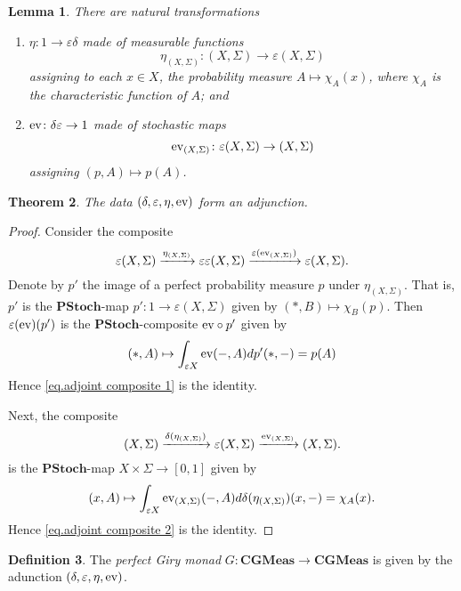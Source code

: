 \documentclass[11pt]{amsart}
\renewcommand{\epsilon}{\varepsilon}
\newcommand{\cat}[1]{\mathbf{#1}}
\newcommand{\ev}{\textup{ev}}
\newcommand{\from}{\colon}
\newcommand{\xto}[1]{\xrightarrow{#1}}
\newtheorem{thm}{Theorem}[section]
\newtheorem{lem}[thm]{Lemma}
\theoremstyle{remark}
\theoremstyle{definition}
\newtheorem{defn}[thm]{Definition}
\begin{document}
\begin{lem}
	There are natural transformations 
	\begin{enumerate}
		\item $\eta \from 1 \to \epsilon \delta$ made of measurable functions
		\[
		\eta_{(X,\Sigma)} \from (X,\Sigma) \to \epsilon (X,\Sigma)
		\]
		assigning to each $x \in X$, the probability measure $A \mapsto \chi_A (x)$, where $\chi_A$ is the characteristic function of $A$; and
		\item $\ev \from \delta \epsilon \to 1$ made of stochastic maps 
		\[
			\ev_{(X,\Sigma)} \from \epsilon (X,\Sigma) \to (X,\Sigma)
		\]
		assigning $(p,A) \mapsto p(A)$.
	\end{enumerate}
\end{lem}

\begin{thm}
	The data $(\delta, \epsilon, \eta, \ev)$ form an adjunction.
\end{thm}
\begin{proof}
	Consider the composite 
	\begin{equation} \label{eq.adjoint composite 1}
		\epsilon (X,\Sigma) \xto{\eta_{(X,\Sigma)}}
		\epsilon \epsilon (X,\Sigma) \xto{\epsilon (\ev_{(X,\Sigma)})}
		\epsilon (X,\Sigma).
	\end{equation}
	Denote by $p'$ the image of a perfect probability measure $p$ under $\eta_{(X,\Sigma)}$. That is, $p'$ is the $\cat{PStoch}$-map $p' \from 1 \to \epsilon (X,\Sigma)$ given by $(\ast,B) \mapsto \chi_B (p)$. Then $\epsilon (\ev) (p')$ is the $\cat{PStoch}$-composite $\ev \circ p'$ given by
	\[
		(\ast,A) \mapsto \int_{\epsilon X} \ev (-,A)dp'(\ast,-) = p(A)
	\]
	 Hence \eqref{eq.adjoint composite 1} is the identity.
	
	Next, the composite 
	\begin{equation} \label{eq.adjoint composite 2}
	(X,\Sigma) \xto{\delta (\eta_{(X,\Sigma)})}
	\epsilon (X,\Sigma) \xto{\ev_{(X,\Sigma)}}
	(X,\Sigma).
	\end{equation}
	is the $\cat{PStoch}$-map $X \times \Sigma \to [0,1]$ given by
	\[
		(x,A) \mapsto \int_{\epsilon X} \ev_{(X,\Sigma)}(-,A)d\delta (\eta_{(X,\Sigma)})(x,-) = \chi_A (x).
	\]
	 Hence \eqref{eq.adjoint composite 2} is the identity.
\end{proof}

\begin{defn}
	The \emph{perfect Giry monad} $G \from \cat{CGMeas} \to\cat{CGMeas}$ is given by the adunction $(\delta, \epsilon, \eta, \ev)$.
\end{defn}
\end{document}

